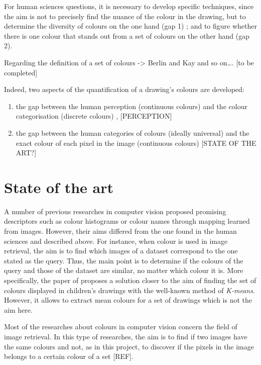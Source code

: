 \documentclass[11pt,a4paper]{article}
\begin{document}
For human sciences questions, it is necessary to develop specific
techniques, since the aim is not to precisely find the nuance of the
colour in the drawing, but to determine the diversity of colours on the
one hand (gap 1) ; and to figure whether there is one colour that stands
out from a set of colours on the other hand (gap 2).

 Regarding the definition of a set of
colours -\textgreater{} Berlin and Kay and so on\ldots{}. {[}to be
completed{]}

Indeed, two aspects of the quantification of a drawing's colours are
developed:

\begin{enumerate}
	\item
	the gap between the human perception (continuous colours) and the
	colour categorisation (discrete colours)
	\cite[see e.g.][]{parragaakbarinia2016, benavente2008, berlinkay1969}, [PERCEPTION]
	\item
	the gap between the human categories of colours (ideally universal)
	and the exact colour of each pixel in the image (continuous colours)
	\cite{khan2012, khan2013} [STATE OF THE ART?]
\end{enumerate}

\section{State of the art}

A number of previous researches in computer vision proposed promising
descriptors such as colour histograms \cite{sun2006} or colour names
\cite{weijer2009, lindner2013} through mapping learned from images.
However, their aims differed from the one found in the human sciences
and described above. For instance, when colour is used in image
retrieval, the aim is to find which images of a dataset correspond to
the one stated as the query. Thus, the main point is to determine if the
colours of the query and those of the dataset are similar, no matter
which colour it is. More specifically, the paper of
\cite{konyushkova2015} proposes a solution closer to the aim of finding
the set of colours displayed in children's drawings with the well-known
method of \emph{K-means}. However, it allows to extract mean colours for
a set of drawings which is not the aim here.

Most of the researches about colours in
computer vision concern the field of image retrieval. In this type of
researches, the aim is to find if two images have the same colours and
not, as in this project, to discover if the pixels in the image belongs
to a certain colour of a set {[}REF{]}.
\end{document}
